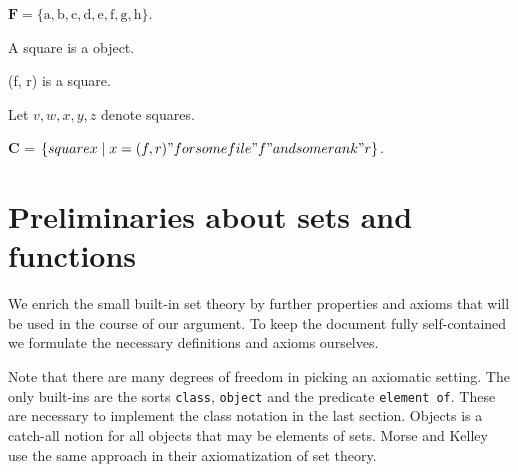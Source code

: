 \documentclass{article}
\newcommand{\File}{\mathbf{F}} %
\newcommand{\fileA}{\mathrm{a}}
\newcommand{\fileB}{\mathrm{b}}
\newcommand{\fileC}{\mathrm{c}}
\newcommand{\fileD}{\mathrm{d}}
\newcommand{\fileE}{\mathrm{e}}
\newcommand{\fileF}{\mathrm{f}}
\newcommand{\fileG}{\mathrm{g}}
\newcommand{\fileH}{\mathrm{h}}
\newcommand{\Checkerboard}{\mathbf{C}}
\begin{document}
\begin{forthel}
    \begin{definition}
        $\File = \{\fileA,\fileB,\fileC,\fileD,\fileE,\fileF,\fileG,\fileH\}$.
    \end{definition}

    \begin{signature} A square is a object. \end{signature}
    \begin{definition}
        (f, r) is a square.
    \end{definition}
    Let $v, w, x, y, z$ denote squares.
    \begin{definition}
        $\Checkerboard$ = $\{ square x \mid x = (f, r) "for some file" f "and some rank" r \}$.
    \end{definition}
\end{forthel}

\section{Preliminaries about sets and functions}

We enrich the small built-in set theory by further properties and axioms that
will be used in the course of our argument. To keep the document fully
self-contained we formulate the necessary definitions and axioms ourselves.

Note that there are many degrees of freedom in picking an axiomatic setting.
The only built-ins are the sorts \texttt{class}, \texttt{object}
and the predicate \texttt{element of}. These are necessary to implement the class notation
in the last section. Objects is a catch-all notion for all objects that may be
elements of sets. Morse and Kelley \cite{Kelley1975,Morse1965} 
use the same approach in their axiomatization of set theory.
\end{document}
